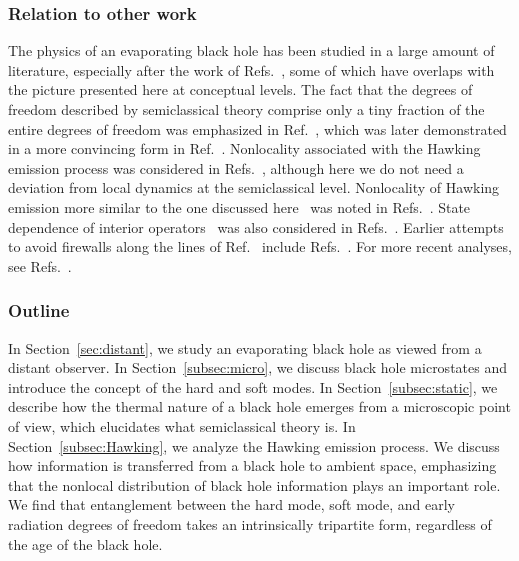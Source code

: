 \documentclass[12pt]{article}
\begin{document}
\subsubsection*{Relation to other work}

The physics of an evaporating black hole has been studied in 
a large amount of literature, especially after the work of 
Refs.~\cite{Almheiri:2012rt,Almheiri:2013hfa,Marolf:2013dba}, 
some of which have overlaps with the picture presented 
here at conceptual levels.  The fact that the degrees of 
freedom described by semiclassical theory comprise only a tiny 
fraction of the entire degrees of freedom was emphasized in 
Ref.~\cite{Nomura:2013lia}, which was later demonstrated in a 
more convincing form in Ref.~\cite{Almheiri:2014lwa}.  Nonlocality 
associated with the Hawking emission process was considered in 
Refs.~\cite{Giddings:2012bm,Giddings:2012gc,Giddings:2013kcj}, 
although here we do not need a deviation from local dynamics at the 
semiclassical level.  Nonlocality of Hawking emission more similar 
to the one discussed here~\cite{Nomura:2014woa,Nomura:2014voa,%
Nomura:2016qum} was noted in Refs.~\cite{Nomura:2014yka,%
Israel:2015ava,Giddings:2015uzr,Giddings:2017mym}.  State 
dependence of interior operators~\cite{Papadodimas:2012aq,%
Papadodimas:2013jku,Papadodimas:2015jra} was also considered 
in Refs.~\cite{Verlinde:2012cy,Nomura:2012ex,Verlinde:2013uja,%
Nomura:2013gna,Verlinde:2013qya}.  Earlier attempts to avoid 
firewalls along the lines of Ref.~\cite{Maldacena:2013xja} 
include Refs.~\cite{Bousso:2012as,Jacobson:2013ewa,%
Harlow:2013tf,Susskind:2013tg}.  For more recent analyses, 
see Refs.~\cite{deBoer:2018ibj,Hayden:2018khn,Almheiri:2018xdw}.

\subsubsection*{Outline}

In Section~\ref{sec:distant}, we study an evaporating black hole 
as viewed from a distant observer.  In Section~\ref{subsec:micro}, 
we discuss black hole microstates and introduce the concept of the 
hard and soft modes.  In Section~\ref{subsec:static}, we describe 
how the thermal nature of a black hole emerges from a microscopic 
point of view, which elucidates what semiclassical theory is. 
In Section~\ref{subsec:Hawking}, we analyze the Hawking emission 
process.  We discuss how information is transferred from a black 
hole to ambient space, emphasizing that the nonlocal distribution 
of black hole information plays an important role.  We find that 
entanglement between the hard mode, soft mode, and early radiation 
degrees of freedom takes an intrinsically tripartite form, regardless 
of the age of the black hole.
\end{document}
